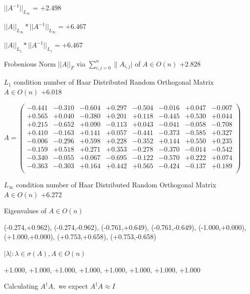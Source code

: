 \documentclass[9pt]{article}
\theoremstyle{plain}
\theoremstyle{definition}
\theoremstyle{remark}
\numberwithin{equation}{section}
\begin{document}
$||A^{-1}||_{L_{\infty}}$ = +2.498

$||A||_{L_{\infty}} * ||A^{-1}||_{L_{\infty}} = +6.467$

$||A||_{L_1} * ||A^{-1}||_{L_1} = +6.467$

Frobenious Norm  $||A||_{\textit{F}}$ via $\sum\limits_{i,j =0}^{n} \|A_{i,j}|$   of  $A \in O(n)$  +2.828

$L_1$ condition number of Haar Distributed Random Orthogonal Matrix $A \in O(n)$ +6.018

$A = \left(
\begin{array}{
cccccccc}
-0.441 & -0.310 & -0.604 & +0.297 & -0.504 & -0.016 & +0.047 & -0.007 \\
+0.565 & +0.040 & -0.380 & +0.201 & +0.118 & -0.445 & +0.530 & +0.044 \\
+0.215 & -0.652 & +0.090 & -0.113 & +0.043 & -0.041 & -0.058 & -0.708 \\
+0.410 & -0.163 & +0.141 & +0.057 & -0.441 & -0.373 & -0.585 & +0.327 \\
-0.006 & -0.296 & +0.598 & +0.228 & -0.352 & +0.144 & +0.550 & +0.235 \\
-0.159 & +0.518 & +0.271 & +0.353 & -0.278 & -0.370 & -0.014 & -0.542 \\
-0.340 & -0.055 & +0.067 & -0.695 & -0.122 & -0.570 & +0.222 & +0.074 \\
-0.363 & -0.303 & +0.164 & +0.442 & +0.565 & -0.424 & -0.137 & +0.189 \\
\end{array}
\right)$ \newline 

$L_{\infty}$ condition number of Haar Distributed Random Orthogonal Matrix $A \in O(n)$ +6.272

Eigenvalues of $A \in O(n)$

(-0.274,+0.962), (-0.274,-0.962), (-0.761,+0.649), (-0.761,-0.649), (-1.000,+0.000), (+1.000,+0.000), (+0.753,+0.658), (+0.753,-0.658)

 $|\lambda | : \lambda \in \sigma(A) , A \in O(n)$

+1.000, +1.000, +1.000, +1.000, +1.000, +1.000, +1.000, +1.000


Calculating $A^{\dag} A,$  we expect $A^{\dag} A \approx I$
\end{document}
